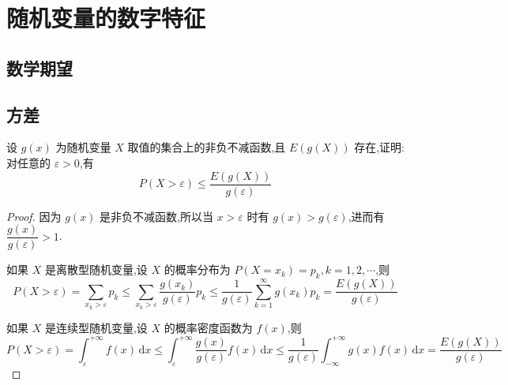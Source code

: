
\chapter{随机变量的数字特征}
\thispagestyle{plain}

\section{数学期望}

\section{方差}

\question 设 $g(x)$ 为随机变量 $X$ 取值的集合上的非负不减函数,且 $E(g(X))$ 存在,证明:对任意的 $\varepsilon > 0$,有
$$
P(X > \varepsilon) \leqslant \dfrac{E(g(X))}{g(\varepsilon)}
$$

\begin{proof}
    因为 $g(x)$ 是非负不减函数,所以当 $x > \varepsilon$ 时有 $g(x) > g(\varepsilon)$,进而有 $\dfrac{g(x)}{g(\varepsilon)} > 1$.

    如果 $X$ 是离散型随机变量,设 $X$ 的概率分布为 $P(X = x_k) = p_k, k=1,2,\cdots$,则
    $$
    P(X > \varepsilon) = \sum_{x_k > \varepsilon} p_k \leqslant \sum_{x_k > \varepsilon} \dfrac{g(x_k)}{g(\varepsilon)} p_k \leqslant \dfrac{1}{g(\varepsilon)} \sum_{k=1}^{\infty} g(x_k) p_k = \dfrac{E(g(X))}{g(\varepsilon)}
    $$

    如果 $X$ 是连续型随机变量,设 $X$ 的概率密度函数为 $f(x)$,则
    $$
    P(X > \varepsilon) = \int_{\varepsilon}^{+\infty} f(x)\,\text{d}x \leqslant \int_{\varepsilon}^{+\infty} \dfrac{g(x)}{g(\varepsilon)} f(x)\,\text{d}x \leqslant \dfrac{1}{g(\varepsilon)} \int_{-\infty}^{+\infty} g(x) f(x)\,\text{d}x = \dfrac{E(g(X))}{g(\varepsilon)}
    $$
\end{proof}